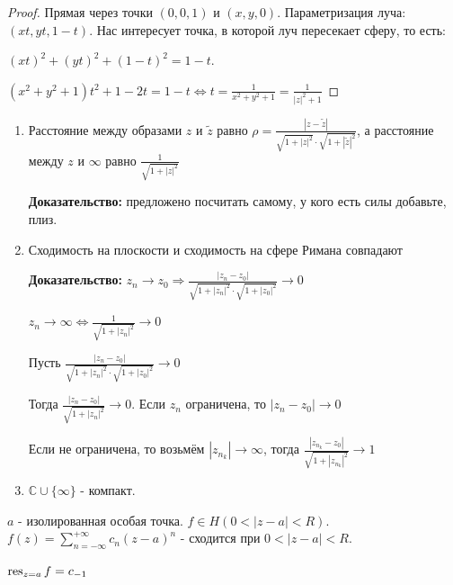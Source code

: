 \begin{proof}
    Прямая через точки $(0, 0, 1)$ и $(x, y, 0)$. Параметризация луча:
    $(xt, yt, 1 - t)$. Нас интересует точка, в которой луч пересекает сферу, то есть:

    $(xt)^2 + (yt)^2 + (1- t)^2 = 1 - t$.

    $(x^2 + y^2 + 1)t^2 + 1 - 2t = 1 - t \Leftrightarrow t = \frac{1}{x^2 + y^2 + 1} = \frac{1}{|z|^2 + 1}$
\end{proof}

\begin{consequence}
    \begin{enumerate}
        \item Расстояние между образами $z$ и $\tilde{z}$ равно $\rho = \frac{|z - \tilde{z}|}{\sqrt{1 + |z|^2} \cdot \sqrt{1 + |\tilde{z}|^2}}$,
        а расстояние между $z$ и $\infty$ равно $\frac{1}{\sqrt{1 + |z|^2}}$

        \textbf{Доказательство:} предложено посчитать самому, у кого есть силы добавьте, плиз.

        \item Сходимость на плоскости и сходимость на сфере Римана совпадают

        \textbf{Доказательство:} $z_n \to z_0 \Rightarrow \frac{|z_n - z_0|}{\sqrt{1 + |z_n|^2}\cdot \sqrt{1 + |z_0|^2}} \to 0$

        $z_n \to \infty \Leftrightarrow \frac{1}{\sqrt{1 + |z_n|^2}} \to 0$

        Пусть $\frac{|z_n - z_0|}{\sqrt{1 + |z_n|^2}\cdot \sqrt{1 + |z_0|^2}} \to 0$

        Тогда $\frac{|z_n - z_0|}{\sqrt{1 + |z_n|^2}} \to 0$. Если $z_n$  ограничена, то $|z_n - z_0| \to 0$

        Если не ограничена, то возьмём $|z_{n_k}| \to \infty$, тогда $\frac{|z_{n_k} - z_0|}{\sqrt{1 + |z_{n_k}|^2}} \to 1$

        \item $\mathbb{C} \cup \{ \infty \}$ - компакт.
    \end{enumerate}
\end{consequence}


\begin{definition}
    $a$ - изолированная особая точка. $f \in H(0 < |z - a| < R)$.
    $f(z) = \sum_{n = -\infty}^{+\infty} c_n (z - a)^n$ - сходится при $0 < |z - a| < R$.

    $\operatorname{res}_{z = a} f = c_{-1}$
\end{definition}

